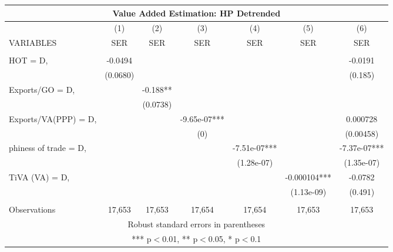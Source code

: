 \documentclass[]{article}
\begin{document}
\begin{tabular}{lcccccc}
\multicolumn{7}{c}{Value Added Estimation: HP Detrended} \\ \hline
 & (1) & (2) & (3) & (4) & (5) & (6) \\
VARIABLES & SER & SER & SER & SER & SER & SER \\ \hline
 &  &  &  &  &  &  \\
HOT = D, & -0.0494 &  &  &  &  & -0.0191 \\
 & (0.0680) &  &  &  &  & (0.185) \\
Exports/GO = D, &  & -0.188** &  &  &  &  \\
 &  & (0.0738) &  &  &  &  \\
Exports/VA(PPP) = D, &  &  & -9.65e-07*** &  &  & 0.000728 \\
 &  &  & (0) &  &  & (0.00458) \\
phiness of trade = D, &  &  &  & -7.51e-07*** &  & -7.37e-07*** \\
 &  &  &  & (1.28e-07) &  & (1.35e-07) \\
TiVA (VA) = D, &  &  &  &  & -0.000104*** & -0.0782 \\
 &  &  &  &  & (1.13e-09) & (0.491) \\
 &  &  &  &  &  &  \\
 Observations & 17,653 & 17,653 & 17,654 & 17,654 & 17,653 & 17,653 \\ \hline
\multicolumn{7}{c}{ Robust standard errors in parentheses} \\
\multicolumn{7}{c}{ *** p$<$0.01, ** p$<$0.05, * p$<$0.1} \\
\end{tabular}
\end{document}
